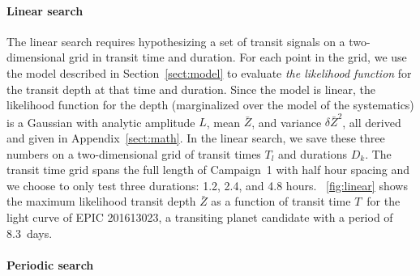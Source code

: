 \documentclass[12pt,preprint]{aastex}
\newcommand{\figref}[1]{\ref{fig:#1}}
\newcommand{\Fig}[1]{\figurename~\figref{#1}}
\newcommand{\sectionname}{Section}
\newcommand{\Sect}[1]{\sectionname~\ref{sect:#1}}
\newcommand{\sect}[1]{\Sect{#1}}
\newcommand{\App}[1]{Appendix~\ref{sect:#1}}
\newcommand{\app}[1]{\App{#1}}
\newcommand{\duration}{{\ensuremath{D}}}
\newcommand{\depth}{{\ensuremath{Z}}}
\newcommand{\transittime}{{\ensuremath{T}}}
\begin{document}
\paragraph{Linear search}

The linear search requires hypothesizing a set of transit signals on a
two-dimensional grid in transit time and duration.
For each point in the grid, we use the model described in \sect{model} to
evaluate \emph{the likelihood function} for the transit depth at that time
and duration.
Since the model is linear, the likelihood function for the depth (marginalized
over the model of the systematics) is a Gaussian with analytic amplitude $L$,
mean $\bar{\depth}$, and variance $\delta\bar{\depth}^2$, all derived and given in
\app{math}.
In the linear search, we save these three numbers on a
two-dimensional grid of transit times $\transittime_l$ and durations
$\duration_k$.
The transit time grid spans the full length of Campaign~1 with half hour spacing
and we choose to only test three durations: 1.2, 2.4, and 4.8 hours.
\Fig{linear} shows the maximum likelihood transit depth $\bar{\depth}$ as a
function of transit time \transittime\ for the light curve of EPIC 201613023,
a transiting planet candidate with a period of 8.3~days.


\paragraph{Periodic search}
\end{document}
